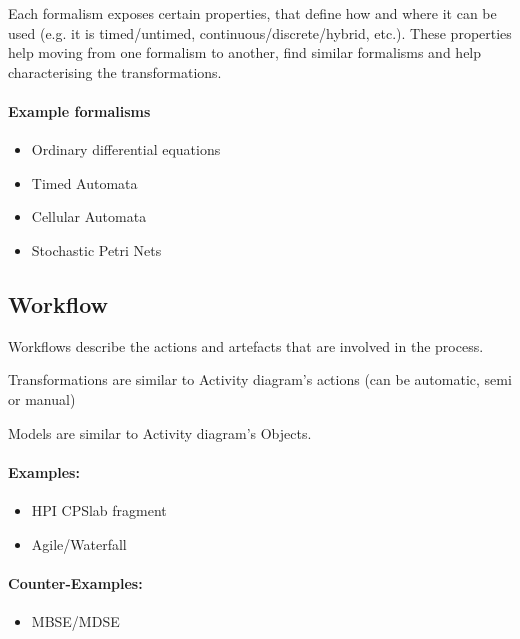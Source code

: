 \begin{definition}
    Each formalism exposes certain properties, that define how and where it can be used (e.g. it is timed/untimed, continuous/discrete/hybrid, etc.).
    These properties help moving from one formalism to another, find similar formalisms and help characterising the transformations.
\end{definition}

\paragraph{Example formalisms}
\begin{itemize}
    \item Ordinary differential equations
    \item Timed Automata
    \item Cellular Automata
    \item Stochastic Petri Nets
\end{itemize}


\subsection{Workflow}
\label{sec:Workflow}

Workflows describe the actions and artefacts that are involved in the process.

Transformations are similar to Activity diagram's actions (can be automatic, semi or manual)

Models are similar to Activity diagram's Objects.

\paragraph{Examples:}
\begin{itemize}
    \item HPI CPSlab fragment
    \item Agile/Waterfall
\end{itemize}

\paragraph{Counter-Examples:}
\begin{itemize}
    \item MBSE/MDSE
\end{itemize}


